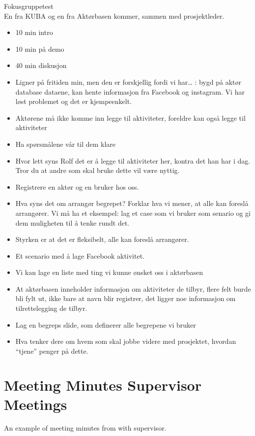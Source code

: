 {\large{Fokusgruppetest}} \\
En fra KUBA og en fra Aktørbasen kommer, sammen med prosjektleder.
\begin{itemize}
\setlength\itemsep{-0.7em}
    \item 10 min intro
    \item 10 min på demo
    \item 40 min diskusjon
    \item Ligner på fritiden min, men den er forskjellig fordi vi har… : bygd på aktør database dataene, kan hente informasjon fra Facebook og instagram. Vi har løst problemet og det er kjempeenkelt.
    \item Aktørene må ikke komme inn legge til aktiviteter, foreldre kan også legge til aktiviteter 
    \item Ha spørsmålene vår til dem klare
    \item Hvor lett syns Rolf det er å legge til aktiviteter her, kontra det han har i dag. Tror du at andre som skal bruke dette vil være nyttig.
    \item Registrere en aktør og en bruker hos oss.
    \item Hva syns det om arrangør begrepet? Forklar hva vi mener, at alle kan foreslå arrangører. Vi må ha et eksempel: lag et case som vi bruker som senario og gi dem muligheten til å tenke rundt det.
    \item Styrken er at det er fleksibelt, alle kan foreslå arrangører.
    \item Et scenario med å lage Facebook aktivitet.
    \item Vi kan lage en liste med ting vi kunne ønsket oss i aktørbasen
    \item At aktørbasen inneholder informasjon om aktiviteter de tilbyr, flere felt burde bli fylt ut, ikke bare at navn blir registrer, det ligger noe informasjon om tilrettelegging de tilbyr.
    \item Lag en begreps slide, som definerer alle begrepene vi bruker
    \item Hva tenker dere om hvem som skal jobbe videre med prosjektet, hvordan “tjene” penger på dette.
\end{itemize}


\section{Meeting Minutes Supervisor Meetings}
\label{meeting_minutes_supervisor_meetings}

An example of meeting minutes from with supervisor.

